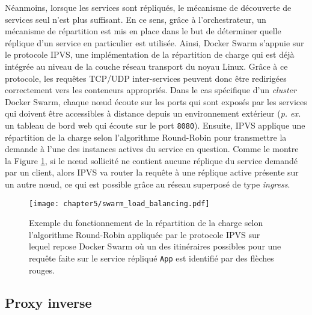 Néanmoins, lorsque les services sont répliqués, le mécanisme de découverte de services seul n'est plus suffisant. En ce sens, grâce à l'orchestrateur,  un mécanisme de répartition est mis en place dans le but de déterminer quelle réplique d'un service en particulier est utilisée. Ainsi, Docker Swarm s'appuie sur le protocole \ac{IPVS}, une implémentation de la répartition de charge qui est déjà intégrée au niveau de la couche réseau transport du noyau Linux. Grâce à ce protocole, les requêtes \acs{TCP}/\acs{UDP} inter-services peuvent donc être redirigées correctement vers les conteneurs appropriés. Dans le cas spécifique d'un \textit{cluster} Docker Swarm, chaque n\oe{}ud écoute sur les ports qui sont exposés par les services qui doivent être accessibles à distance depuis un environnement extérieur (\textit{p. ex.} un tableau de bord web qui écoute sur le port \texttt{8080}). Ensuite, \acs{IPVS} applique une répartition de la charge selon l'algorithme Round-Robin \citep{Ghaffarinejad2014} pour transmettre la demande à l'une des instances actives du service en question. Comme le montre la Figure \ref{fig:swarm_load_balancing}, si le n\oe{}ud sollicité ne contient aucune réplique du service demandé par un client, alors \acs{IPVS} va router la requête à une réplique active présente sur un autre n\oe{}ud, ce qui est possible grâce au réseau superposé de type \textit{ingress}.

\begin{figure}[H]
	\centering
	\texttt{[image: chapter5/swarm\_load\_balancing.pdf]}
        \caption{Exemple du fonctionnement de la répartition de la charge selon l'algorithme Round-Robin appliquée par le protocole \acs{IPVS} sur lequel repose Docker Swarm où un des itinéraires possibles pour une requête faite sur le service répliqué \texttt{App} est identifié par des flèches rouges.}
	\label{fig:swarm_load_balancing}
\end{figure}

\subsection{Proxy inverse}

